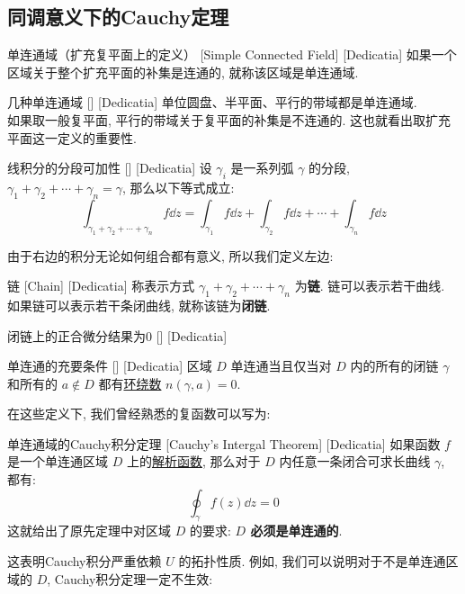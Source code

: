 \documentclass[UTF8]{ctexart}
\newcommand{\AnalyticalFunction}{\hyperref[dfn:AnalyticalFunction]{解析函数}}
\begin{document}
\subsection{同调意义下的Cauchy定理}
\begin{dfn}
    [UUID]
    {单连通域（扩充复平面上的定义）}
    [Simple Connected Field]
    [Dedicatia]
    如果一个区域关于整个扩充平面的补集是连通的, 就称该区域是单连通域. 
\end{dfn}
\begin{xmp}
    [UUID]
    {几种单连通域}
    []
    [Dedicatia]
    单位圆盘、半平面、平行的带域都是单连通域. \\
    如果取一般复平面, 平行的带域关于复平面的补集是不连通的. 这也就看出取扩充平面这一定义的重要性. 
\end{xmp}
\begin{ppt}
    [UUID]
    {线积分的分段可加性}
    []
    [Dedicatia]
    设 \( \gamma_i \) 是一系列弧 \( \gamma \) 的分段,  \( \gamma_1+\gamma_2+\cdots+\gamma_n=\gamma \), 那么以下等式成立: 
    \[\int_{\gamma_1+\gamma_2+\cdots+\gamma_n}f\dd{z}=\int_{\gamma_1}f\dd{z}+\int_{\gamma_2}f\dd{z}+\cdots+\int_{\gamma_n}f\dd{z}\]
\end{ppt}
由于右边的积分无论如何组合都有意义, 所以我们定义左边: 
\begin{dfn}
    [UUID]
    {链}
    [Chain]
    [Dedicatia]
    称表示方式 \( \gamma_1+\gamma_2+\cdots+\gamma_n \) 为\textbf{链}. 链可以表示若干曲线. 如果链可以表示若干条闭曲线, 就称该链为\textbf{闭链}. 
\end{dfn}
\begin{ppt}
    [UUID]
    {闭链上的正合微分结果为0}
    []
    [Dedicatia]
\end{ppt}
\begin{thm}
    [UUID]
    {单连通的充要条件}
    []
    [Dedicatia]
    区域 \( D \) 单连通当且仅当对 \( D \) 内的所有的闭链 \( \gamma \) 和所有的 \( a\notin D \) 都有\hyperref[dfn:WindingNumber]{环绕数} \( n(\gamma,a)=0 \).
\end{thm}
在这些定义下, 我们曾经熟悉的复函数可以写为: 
\begin{thm}
    [UUID]
    {单连通域的Cauchy积分定理}
    [Cauchy's Intergal Theorem]
    [Dedicatia]
    如果函数 \( f \) 是一个单连通区域 \( D \) 上的\AnalyticalFunction, 那么对于 \( D \) 内任意一条闭合可求长曲线 \( \gamma \), 都有: 
    \[\oint_{\gamma} f(z) \dd z = 0\]
    这就给出了原先定理中对区域 \( D \) 的要求: \textbf{ \( D \) 必须是单连通的}. 
\end{thm}
这表明Cauchy积分严重依赖 \( U \) 的拓扑性质. 例如, 我们可以说明对于不是单连通区域的 \( D \), Cauchy积分定理一定不生效: 
\end{document}
